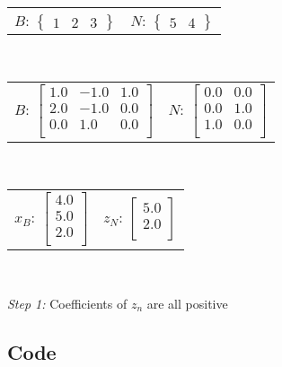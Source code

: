 \documentclass{article}
\begin{document}
\begin{center}
\begin{tabular}{cc}$B$: ${\left\{\begin{array}{ccc}1 & 2 & 3\end{array}\right\}}$ & $N$: ${\left\{\begin{array}{cc}5 & 4\end{array}\right\}}$\end{tabular}\\

\begin{tabular}{cc}$B$: $\left[\begin{array}{ccc}1.0 & -1.0 & 1.0\\ 2.0 & -1.0 & 0.0\\ 0.0 & 1.0 & 0.0\\ \end{array}\right]$ & $N$: $\left[\begin{array}{cc}0.0 & 0.0\\ 0.0 & 1.0\\ 1.0 & 0.0\\ \end{array}\right]$\end{tabular}\\

\begin{tabular}{cc}$x_B$: $\left[\begin{array}{c}4.0\\ 5.0\\ 2.0\\ \end{array}\right]$ & $z_N$: $\left[\begin{array}{c}5.0\\ 2.0\\ \end{array}\right]$\end{tabular}\\

\end{center}
\textit{Step 1:}
Coefficients of $z_n$ are all positive


\subsection{Code}
\end{document}
